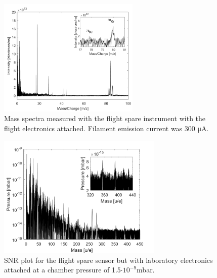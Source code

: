 		\begin{figure} %
			\centering
			\includegraphics[width = 0.6\textwidth]{Experiments/FS_thMode300uA.png}
			\caption{Mass spectra measured with the flight spare instrument with the flight electronics attached. Filament emission current was 300 \si{\micro\ampere}.}
			\label{fig:ExpFSFlightElK78}
		\end{figure}
		
		\begin{figure}[h]
			\centering
			\includegraphics[width = 0.7\textwidth]{Experiments/FSLabSNRRestGasPressCal.png}
			\caption{SNR plot for the flight spare sensor but with laboratory electronics attached at a chamber pressure of 1.5$\cdot10^{-9}$\si{\milli\bar}.}
			\label{fig:ExpFSFlightSenSNR}
		\end{figure}
	
	
	
	
	
	
	